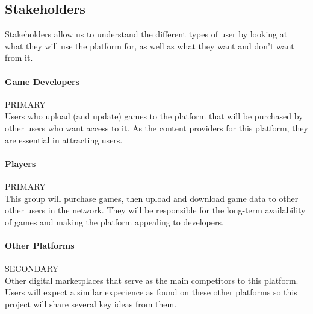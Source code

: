 
\subsection{Stakeholders}

Stakeholders allow us to understand the different types of user by looking at what they will use the platform for, as well as what they want and don't want from it.

\newcommand{\primary}{\hspace*{\fill}PRIMARY\\}
\newcommand{\secondary}{\hspace*{\fill}SECONDARY\\}
\newcommand{\tertiary}{\hspace*{\fill}TERTIARY\\}

\paragraph*{Game Developers}\primary
Users who upload (and update) games to the platform that will be purchased by other users who want access to it. As the content providers for this platform, they are essential in attracting users.

\paragraph*{Players}\primary
This group will purchase games, then upload and download game data to other other users in the network. They will be responsible for the long-term availability of games and making the platform appealing to developers.

\paragraph*{Other Platforms}\secondary
Other digital marketplaces that serve as the main competitors to this platform. Users will expect a similar experience as found on these other platforms so this project will share several key ideas from them.